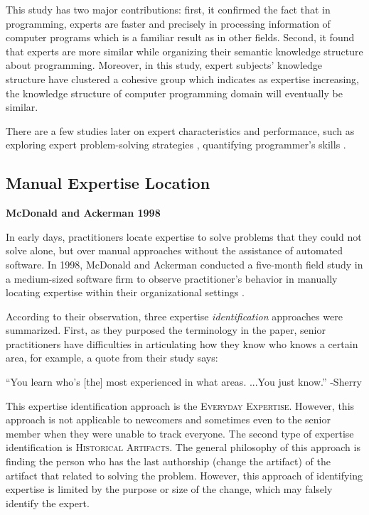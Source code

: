 This study has two major contributions: first, it confirmed the fact that in programming, experts are faster and precisely in processing information of computer programs which is a familiar result as in other fields. Second, it found that experts are more similar while organizing their semantic knowledge structure about programming. Moreover, in this study, expert subjects' knowledge structure have clustered a cohesive group which indicates as expertise increasing, the knowledge structure of computer programming domain will eventually be similar. 

There are a few studies later on expert characteristics and performance, such as exploring expert problem-solving strategies \cite{davies1994knowledge, koenemann1991expert}, quantifying programmer's skills \cite{stanislaw1994note}.

\subsection{Manual Expertise Location}

\textbf{McDonald and Ackerman 1998}

In early days, practitioners locate expertise to solve problems that they could not solve alone, but over manual approaches without the assistance of automated software. In 1998, McDonald and Ackerman conducted a five-month field study in a medium-sized software firm to observe practitioner's behavior in manually locating expertise within their organizational settings \cite{mcdonald1998just}.

According to their observation, three expertise \textit{identification} approaches were summarized. First, as they purposed the terminology in the paper, senior practitioners have difficulties in articulating how they know who knows a certain area, for example, a quote from their study says:

\begin{displayquote}
``You learn who's [the] most experienced in what areas. ...You just know.'' 
-Sherry
\end{displayquote}

This expertise identification approach is the \textsc{Everyday Expertise}. However, this approach is not applicable to newcomers and sometimes even to the senior member when they were unable to track everyone. The second type of expertise identification is \textsc{Historical Artifacts}. The general philosophy of this approach is finding the person who has the last authorship (change the artifact) of the artifact that related to solving the problem. However, this approach of identifying expertise is limited by the purpose or size of the change, which may falsely identify the expert.

